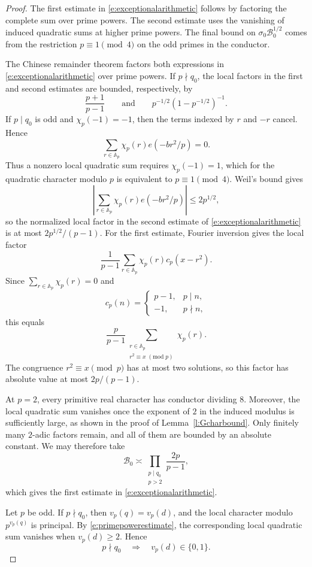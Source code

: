 \documentclass[12pt,reqno]{amsart}
\numberwithin{equation}{section}
\theoremstyle{definition}
\theoremstyle{remark}
\begin{document}
\begin{proof}
The first estimate in \eqref{e:exceptionalarithmetic} follows by factoring the complete sum over prime powers. The second estimate uses the vanishing of induced quadratic sums at higher prime powers. The final bound on \(\sigma_0\mathcal B_0^{1/2}\) comes from the restriction \(p\equiv1\pmod4\) on the odd primes in the conductor.

The Chinese remainder theorem factors both expressions in
\eqref{e:exceptionalarithmetic} over prime powers.  If $p\nmid q_0$,
the local factors in the first and second estimates are bounded,
respectively, by
\[
 \frac{p+1}{p-1}
 \qquad\text{and}\qquad
 p^{-1/2}(1-p^{-1/2})^{-1}.
\]
If \(p\mid q_0\) is odd and 
\(\chi_p(-1)=-1\), then the terms indexed by \(r\) and \(-r\) cancel.
Hence
\[
 \sum_{r\in\mathbb A_p}\chi_p(r)e(-br^2/p)=0.
\]
Thus a nonzero local quadratic sum requires \(\chi_p(-1)=1\), which for
the quadratic character modulo \(p\) is equivalent to
\(p\equiv1\pmod4\).  Weil's bound gives
\[
 \left|
 \sum_{r\in\mathbb A_p}\chi_p(r)e(-br^2/p)
 \right|
 \leq 2p^{1/2},
\]
so the normalized local factor in the second estimate of
\eqref{e:exceptionalarithmetic} is at most
\(2p^{1/2}/(p-1)\).
For the first estimate, Fourier inversion gives the local factor
\[
 \frac1{p-1}\sum_{r\in\mathbb A_p}
 \chi_p(r)c_p(x-r^2).
\]
Since \(\sum_{r\in\mathbb A_p}\chi_p(r)=0\) and
\[
 c_p(n)=
 \begin{cases}
  p-1,&p\mid n,\\
  -1,&p\nmid n,
 \end{cases}
\]
this equals
\[
 \frac{p}{p-1}
 \sum_{\substack{r\in\mathbb A_p\\r^2\equiv x\;(\mathrm{mod}\;p)}}
 \chi_p(r).
\]
The congruence \(r^2\equiv x\pmod p\) has at most two solutions, so this
factor has absolute value at most \(2p/(p-1)\).

At \(p=2\), every primitive real character has conductor dividing \(8\).
Moreover, the local quadratic sum vanishes once the exponent of \(2\)
in the induced modulus is sufficiently large, as shown in the proof of
Lemma~\ref{l:Gcharbound}.  Only finitely many \(2\)-adic factors remain,
and all of them are bounded by an absolute constant. We may therefore take
\[
 \mathcal B_0\asymp
 \prod_{\substack{p\mid q_0\\p>2}}\frac{2p}{p-1},
\]
which gives the first estimate in
\eqref{e:exceptionalarithmetic}.

Let \(p\) be odd.  If \(p\nmid q_0\), then
\(v_p(q)=v_p(d)\), and the local character modulo \(p^{v_p(q)}\) is
principal.  By \eqref{e:primepowerestimate}, the corresponding local
quadratic sum vanishes when \(v_p(d)\geq2\).  Hence
\[
 p\nmid q_0
 \quad\Longrightarrow\quad
 v_p(d)\in\{0,1\}.
\]


\end{proof}
\end{document}
